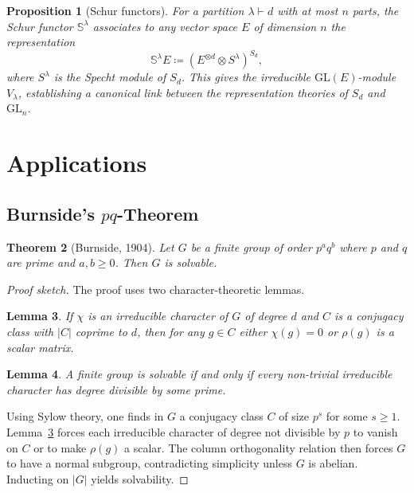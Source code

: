 \documentclass[12pt,a4paper]{amsart}
\newtheorem{theorem}{Theorem}[section]
\newtheorem{lemma}[theorem]{Lemma}
\newtheorem{proposition}[theorem]{Proposition}
\theoremstyle{definition}
\begin{document}
\begin{proposition}[Schur functors]
For a partition $\lambda \vdash d$ with at most $n$ parts, the Schur functor
$\mathbb{S}^\lambda$ associates to any vector space $E$ of dimension $n$ the
representation
\[
    \mathbb{S}^\lambda E \coloneqq (E^{\otimes d} \otimes S^\lambda)^{S_d},
\]
where $S^\lambda$ is the Specht module of $S_d$.  This gives the irreducible
$\mathrm{GL}(E)$-module $V_\lambda$, establishing a canonical link between the
representation theories of $S_d$ and $\mathrm{GL}_n$.
\end{proposition}

\section{Applications}
\label{sec:applications}

\subsection{Burnside's $pq$-Theorem}

\begin{theorem}[Burnside, 1904]
\label{thm:burnside_pq}
Let $G$ be a finite group of order $p^a q^b$ where $p$ and $q$ are prime and
$a, b \geq 0$.  Then $G$ is solvable.
\end{theorem}

\begin{proof}[Proof sketch]
The proof uses two character-theoretic lemmas.

\begin{lemma}
\label{lem:b1}
If $\chi$ is an irreducible character of $G$ of degree $d$ and $C$ is a
conjugacy class with $|C|$ coprime to $d$, then for any $g \in C$ either
$\chi(g) = 0$ or $\rho(g)$ is a scalar matrix.
\end{lemma}

\begin{lemma}
\label{lem:b2}
A finite group is solvable if and only if every non-trivial irreducible character
has degree divisible by some prime.
\end{lemma}

Using Sylow theory, one finds in $G$ a conjugacy class $C$ of size $p^s$ for some
$s \geq 1$.  Lemma~\ref{lem:b1} forces each irreducible character of degree not
divisible by $p$ to vanish on $C$ or to make $\rho(g)$ a scalar.  The column
orthogonality relation then forces $G$ to have a normal subgroup, contradicting
simplicity unless $G$ is abelian.  Inducting on $|G|$ yields solvability.
\end{proof}
\end{document}
